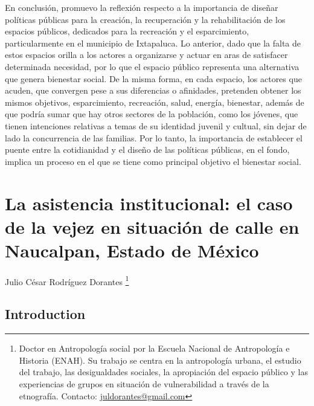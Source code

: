 \documentclass[
  spanish,
  11pt,
  a4paper,
]{scrbook}
\begin{document}
En conclusión, promuevo la reflexión respecto a la importancia de
diseñar políticas públicas para la creación, la recuperación y la
rehabilitación de los espacios públicos, dedicados para la recreación y
el esparcimiento, particularmente en el municipio de Ixtapaluca. Lo
anterior, dado que la falta de estos espacios orilla a los actores a
organizarse y actuar en aras de satisfacer determinada necesidad, por lo
que el espacio público representa una alternativa que genera bienestar
social. De la misma forma, en cada espacio, los actores que acuden, que
convergen pese a sus diferencias o afinidades, pretenden obtener los
mismos objetivos, esparcimiento, recreación, salud, energía, bienestar,
además de que podría sumar que hay otros sectores de la población, como
los jóvenes, que tienen intenciones relativas a temas de su identidad
juvenil y cultual, sin dejar de lado la concurrencia de las familias.
Por lo tanto, la importancia de establecer el puente entre la
cotidianidad y el diseño de las políticas públicas, en el fondo, implica
un proceso en el que se tiene como principal objetivo el bienestar
social.

\printbibliography[heading=subbibliography, title={Referencias Bibliográficas}]


\chapter{La asistencia institucional: el caso de la vejez en situación
de calle en Naucalpan, Estado de
México}\label{la-asistencia-institucional-el-caso-de-la-vejez-en-situaciuxf3n-de-calle-en-naucalpan-estado-de-muxe9xico}

\begin{flushright}
\Large Julio César Rodríguez Dorantes \footnote{Doctor en Antropología social por la Escuela Nacional de Antropología e Historia (ENAH). Su trabajo se centra en la antropología urbana, el estudio del trabajo, las desigualdades sociales, la apropiación del espacio público y las experiencias de grupos en situación de vulnerabilidad a través de la etnografía. Contacto: \href{juldorantes@gmail.com}{juldorantes@gmail.com}}
\end{flushright}

\section*{Introduction}\label{introduction}
\end{document}
